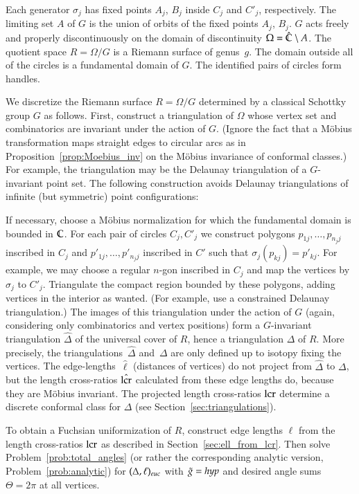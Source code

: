 \documentclass[Thesis]{subfiles}
\begin{document}
Each generator $\sigma_{j}$ has fixed points $A_{j}$, $B_{j}$ inside
$C_{j}$ and $C'_{j}$, respectively. The limiting set $A$ of $G$ is the
union of orbits of the fixed points $A_{j}$, $B_{j}$. $G$ acts freely
and properly discontinuously on the domain of discontinuity
$\Omega=\hat{\mathbb C}\setminus A$. The quotient space $R=\Omega/G$ is a
Riemann surface of genus~$g$. The domain outside all of the circles is
a fundamental domain of $G$. The identified pairs of circles form
handles.

We discretize the Riemann surface $R=\Omega/G$ determined by a
classical Schottky group $G$ as follows. First, construct a
triangulation of $\Omega$ whose vertex set and combinatorics are
invariant under the action of $G$. (Ignore the fact that a M{\"o}bius
transformation maps straight edges to circular arcs as in
Proposition~\ref{prop:Moebius_inv} on the M{\"o}bius invariance of
conformal classes.) For example, the triangulation may be the Delaunay
triangulation of a $G$-invariant point set. The following construction
avoids Delaunay triangulations of infinite (but symmetric) point
configurations:

If necessary, choose a M{\"o}bius normalization for which the
fundamental domain is bounded in $\mathbb C$. For each pair of circles
$C_{j}, C'_{j}$ we construct polygons $p_{1j},\ldots,p_{n_{j}j}$
inscribed in $C_{j}$ and $p'_{1j},\ldots,p'_{n_{j}j}$ inscribed in
$C'$ such that $\sigma_{j}(p_{kj})=p'_{kj}$. For example, we may
choose a regular $n$-gon inscribed in $C_{j}$ and map the vertices by
$\sigma_{j}$ to $C'_{j}$.  Triangulate the compact region bounded by
these polygons, adding vertices in the interior as wanted. (For
example, use a constrained Delaunay triangulation.) The images of this
triangulation under the action of $G$ (again, considering only
combinatorics and vertex positions) form a $G$-invariant triangulation
$\hat\Delta$ of the universal cover of $R$, hence a triangulation
$\Delta$ of $R$. More precisely, the triangulations~$\hat\Delta$
and~$\Delta$ are only defined up to isotopy fixing the vertices. The
edge-lengths~$\hat\ell$ (distances of vertices) do not project from
$\hat\Delta$ to $\Delta$, but the length cross-ratios $\hat{\operatorname{lcr}}$
calculated from these edge lengths do, because they are M{\"o}bius
invariant. The projected length cross-ratios $\operatorname{lcr}$ determine a
discrete conformal class for $\Delta$ (see
Section~\ref{sec:triangulations}).

To obtain a Fuchsian uniformization of $R$, construct edge lengths
$\ell$ from the length cross-ratios $\operatorname{lcr}$ as described in
Section~\ref{sec:ell_from_lcr}. Then solve
Problem~\ref{prob:total_angles} (or rather the corresponding analytic
version, Problem~\ref{prob:analytic}) for $(\Delta,\ell)_{\euc}$ with
$\tilde{g}=\mathit{hyp}$ and desired angle sums $\Theta=2\pi$ at all vertices.
\end{document}
